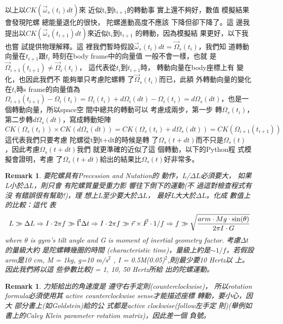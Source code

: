 \documentclass[12pt,a4paper]{article}
\newtheorem{remark}[theorem]{Remark}
\begin{document}
以上以$CK\left( \vec{\omega}_{s}(t_{i})dt\right) $來%
近似t$_{i}$到t$_{i+1}$的轉動事%
實上還不夠好，數值%
模擬結果會發現陀螺%
總能量退化的很快，%
陀螺進動高度不應該%
下降但卻下降了。這%
邊我提出以$CK\left( \vec{\omega}%
_{s}(t_{i+1})dt\right) $來近似t$_{i}$到t$_{i+1}$%
的轉動，因為模擬結%
果更好，以下我也嘗%
試提供物理解釋。這%
裡我們暫時假設$\vec{\omega}%
_{s}(t_{i})dt=\vec{\Omega}_{s}(t_{i})$，我們知%
道轉動向量在$t_{i+1}$跟$t_{i}$%
時刻在body frame中的向量值%
一般不會一樣，也就%
是$\vec{\Omega}_{i+1}(t_{i+1})\neq \vec{\Omega}_{i}(t_{i})$，%
這代表從$t_{i}$到$t_{i+1}$時，%
轉動向量在body座標上有%
變化，也因此我們不%
能夠單只考慮陀螺轉%
了$\vec{\Omega}_{s}(t_{i})$而已，此額%
外轉動向量的變化在$%
t_{i}$時s frame的向量值為$\Omega
_{i+1}(t_{i+1})-\Omega _{i}(t_{i})=\Omega _{i}(t_{i})+d\Omega
_{i}(dt)-\Omega _{i}(t_{i})=d\Omega _{s}(dt)$，也是一%
個轉動向量，所以space空%
間中總共的轉動可以%
考慮成兩步，第一步%
轉$\Omega _{s}(t_{i})$，第二步轉$d\Omega
_{s}(dt)$，寫成轉動矩陣%
\begin{equation}
CK(\Omega _{s}(t_{i}))\times CK(d\Omega _{s}(dt))=CK(\Omega
_{s}(t_{i})+d\Omega _{s}(dt))=CK(\Omega _{i+1}(t_{i+1}))
\end{equation}%
這代表我們只要考慮%
陀螺從t到t+dt的時候是轉%
了$\Omega _{s}(t+dt)$而不只是$\Omega _{s}(t)$%
，因此考慮$\Omega _{s}(t+dt)$我們%
就更準確的近似了這%
個轉動，以下的Python程%
式模擬會證明，考慮%
了$\Omega _{s}(t+dt)$給出的結果比$%
\Omega _{s}(t)$好非常多。

\begin{remark}
要陀螺具有Precession and Nutation的%
動作，L/$\Delta L$必須要大，%
如果L小於$\Delta L$，則只會%
有陀螺質量受重力影%
響往下倒下的運動(不%
過這對檢查程式有沒%
有錯誤很有幫助!)，理%
想上L至少要大於$\Delta L$，%
最好L大大於$\Delta L$。化成%
數值上的比較：這代%
表%
\begin{equation}
L\gg \Delta L\Rightarrow I\cdot 2\pi f\gg \vec{\Gamma}\Delta t\Rightarrow
I\cdot 2\pi f\gg \vec{r}\times \vec{F}\cdot 1/f\Rightarrow f\gg \sqrt{\frac{%
arm\cdot Mg\cdot \sin (\theta )}{2\pi I\cdot G}}
\end{equation}%
where $\theta $ is gyro's tilt angle and G is moment of inertial geometry
factor. 考慮$\Delta t$的量級大約%
是陀螺轉幾圈的時間%
(characteristic time)，量級上約是$\sim
1/f$，若假設arm是10 cm, M = 1kg, g=10 m/s$^{2}$%
, I = 0.5M(0.05)$^{2}$,則f最少要10 Hertz以%
上。因此我們將以這%
些參數比較f = 1, 10, 50 Hertz所給%
出的陀螺運動。
\end{remark}

\begin{remark}
力矩給出的角速度是%
遵守右手定則(counterclockwise)，%
所以rotation formula必須使用其%
active counterclockwise sense才能描述座標%
轉動，要小心，因大%
部分書上(如Goldstein)給的公%
式都是active clockwise(follow左手定%
則)(舉例如書上的Caley Klein
parameter rotation matrix)，因此差一個%
負號。\bigskip
\end{remark}
\end{document}
